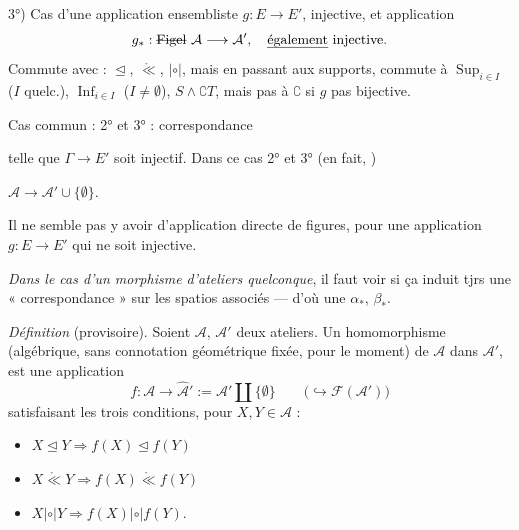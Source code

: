 \documentclass[11pt,a4paper]{article}
\begin{document}
3°) Cas d'une application ensembliste $g : E \to E'$, injective, et application
\[
  g_{*} : \text{\struck{$\operatorname{Figel}$}}\ \mathcal{A} \longrightarrow \mathcal{A}', \quad \text{\uncertain{également} injective.}
\]
Commute avec : $\trianglelefteq$, $\mathring{\ll}$, $|{\circ}|$, mais en passant aux supports, commute à $\operatorname{Sup}_{i \in I}$ ($I$ quelc.), $\operatorname{Inf}_{i \in I}$ ($I \neq \emptyset$), $S \wedge \complement T$, mais pas à $\complement$ si $g$ pas bijective.


Cas commun : 2° et 3° : correspondance


telle que $\Gamma \to E'$ soit injectif. Dans ce cas \ill{} 2° et 3° (en fait, ) 


$\mathcal{A} \to \mathcal{A}' \cup \{\emptyset\}$.

Il ne semble pas y avoir d'application directe de figures, pour une application $g : E \to E'$ qui ne soit injective.

\textit{Dans le cas d'un morphisme d'ateliers quelconque}, il faut voir si ça induit tjrs une « correspondance » sur les spatios associés — d'où une $\alpha_{*}$, $\beta_{*}$.

\textit{Définition} (provisoire). Soient $\mathcal{A}$, $\mathcal{A}'$ deux ateliers. Un  homomorphisme (algébrique, sans connotation géométrique fixée, pour le moment) de $\mathcal{A}$ dans $\mathcal{A}'$, est une application 
\[
  f : \mathcal{A} \longrightarrow \hat{\mathcal{A}}' := \mathcal{A}' \amalg \{\emptyset\}
  \qquad \bigl(\hookrightarrow \mathcal{F}(\mathcal{A}')\bigr)
\]
satisfaisant les trois conditions, pour $X, Y \in \mathcal{A}$ :
\begin{itemize}
  \item[a)] $X \trianglelefteq Y \Longrightarrow f(X) \trianglelefteq f(Y)$
  \item[b)] $X \mathrel{\mathring{\ll}} Y \Longrightarrow f(X) \mathrel{\mathring{\ll}} f(Y)$
  \item[c)] $X \mathrel{|{\circ}|} Y \Longrightarrow f(X) \mathrel{|{\circ}|} f(Y)$.
\end{itemize}
\end{document}
